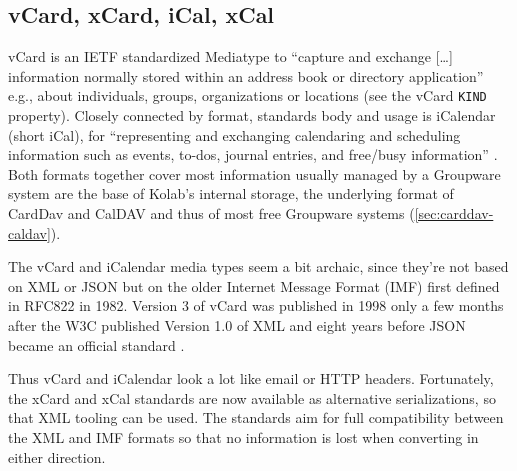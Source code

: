 \documentclass[11pt,a4paper,headsepline,twoside]{scrartcl}		%
\begin{document}
\subsection{vCard, xCard, iCal, xCal}
\label{sec:vcard-xcard-ical}

vCard is an IETF standardized Mediatype to ``capture and exchange [\ldots]
information normally stored within an address book or directory application''
\cite{RFC6350} e.g., about individuals, groups, organizations or locations (see
the vCard \lstinline:KIND: property). Closely connected by format, standards
body and usage is iCalendar (short iCal), for ``representing and exchanging
calendaring and scheduling information such as events, to-dos, journal entries,
and free/busy information'' \cite{RFC5545}. Both formats together cover most
information usually managed by a Groupware system are the base of Kolab's
internal storage, the underlying format of CardDav and CalDAV and thus of most
free Groupware systems (\autoref{sec:carddav-caldav}).

The vCard and iCalendar media types seem a bit archaic, since they're not based
on XML or JSON but on the older Internet Message Format \cite{RFC5322} (IMF)
first defined in RFC822 in 1982. Version 3 of vCard was published in
1998 \cite{RFC2425} only a few months after the W3C published Version 1.0 of
XML \cite{Paoli:98:XR} and eight years before JSON became an official
standard \cite{RFC4627}.

Thus vCard and iCalendar look a lot like email or HTTP headers. Fortunately, the
xCard \cite{RFC6351} and xCal \cite{RFC6321} standards are now available as
alternative serializations, so that XML tooling can be used. The standards aim
for full compatibility between the XML and IMF formats so that no information is
lost when converting in either direction.


\end{document}
